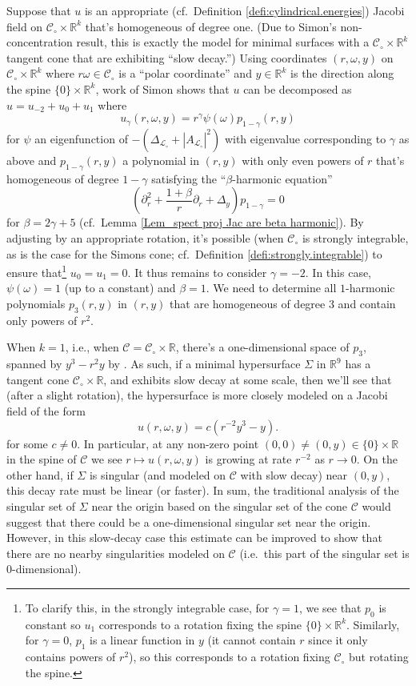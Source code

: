 \documentclass[11pt, letterpaper, reqno]{amsart}
\numberwithin{equation}{section}
\theoremstyle{remark}
\newcommand{\RR}{\mathbb{R}}
\newcommand{\cC}{\mathcal{C}}
\newcommand{\cL}{\mathcal{L}}
\begin{document}
Suppose that $u$ is an appropriate (cf.\ Definition \ref{defi:cylindrical.energies}) Jacobi field on $\cC_\circ \times \RR^k$ that's homogeneous of degree one. (Due to Simon's non-concentration result, this is exactly the  model for minimal surfaces with a $\cC_\circ \times \RR^k$  tangent cone that are exhibiting ``slow decay.'') Using coordinates $(r,\omega,y)$ on $\cC_\circ \times \RR^k$ where $r\omega \in\cC_\circ$ is a ``polar coordinate'' and $y \in \RR^k$ is the direction along the spine $\{0\}\times \RR^k$, work of Simon shows that $u$ can be decomposed as $u=u_{-2}+u_0 + u_1$ where 
\[
u_\gamma(r,\omega,y) = r^\gamma \psi(\omega) p_{1-\gamma}(r,y)
\]
for $\psi$ an eigenfunction of $-(\Delta_{\cL_\circ} + |A_{\cL_\circ}|^2)$ with eigenvalue corresponding to $\gamma$ as above and $p_{1-\gamma}(r,y)$ a polynomial in $(r,y)$ with only even powers of $r$ that's homogeneous of degree  $1-\gamma$ satisfying the ``$\beta$-harmonic equation''
\[
\left( \partial^2_r + \frac{1+\beta}{r} \partial_r + \Delta_y\right) p_{1-\gamma} = 0
\]
for $\beta = 2\gamma+5$ (cf.\ Lemma \ref{Lem_spect proj Jac are beta harmonic}). By adjusting by an appropriate rotation, it's possible (when $\cC_\circ$ is strongly integrable, as is the case for the Simons cone; cf.\ Definition \ref{defi:strongly.integrable}) to ensure that\footnote{To clarify this, in the strongly integrable case, for $\gamma=1$, we see that $p_0$ is constant so $u_1$ corresponds to a rotation fixing the spine $\{0\}\times \RR^k$. Similarly, for $\gamma=0$, $p_1$ is a linear function in $y$ (it cannot contain $r$ since it only contains powers of $r^2$), so this corresponds to a rotation fixing $\cC_\circ$ but rotating the spine.   } $u_0=u_1=0$. It thus remains to consider $\gamma=-2$. In this case, $\psi(\omega) = 1$ (up to a constant) and $\beta = 1$. We need to determine all $1$-harmonic polynomials $p_3(r, y)$ in $(r,y)$ that are homogeneous of degree $3$ and contain only powers of $r^2$. 

When $k=1$, i.e., when $\cC=\cC_\circ\times \RR$, there's a one-dimensional space of $p_3$, spanned by $y^3-r^2 y$ by \cite[Section 3]{Simon:liouville}. As such, if a minimal hypersurface $\Sigma$ in $\RR^9$ has a tangent cone $\cC_\circ\times \RR$, and exhibits slow decay at some scale, then we'll see that (after a slight rotation), the hypersurface is more closely modeled on a Jacobi field of the form
\[
u(r,\omega,y) = c (r^{-2}y^3-y). 
\]
for some $c\neq 0$. In particular, at any non-zero point $(0,0) \neq (0,y) \in \{0\}\times \RR $ in the spine of $\cC$ we see $r \mapsto u(r,\omega,y)$ is growing at rate $r^{-2}$ as $r\to 0$. On the other hand, if $\Sigma$ is singular (and modeled on $\cC$ with slow decay) near $(0,y)$, this decay rate must be linear (or faster). In sum, the traditional analysis of the singular set of $\Sigma$ near the origin based on the singular set of the cone $\cC$ would suggest that there could be a one-dimensional singular set near the origin. However, in this slow-decay case this estimate can be improved to show that there are no nearby singularities modeled on $\cC$ (i.e.\ this part of the singular set is $0$-dimensional). 
\end{document}
